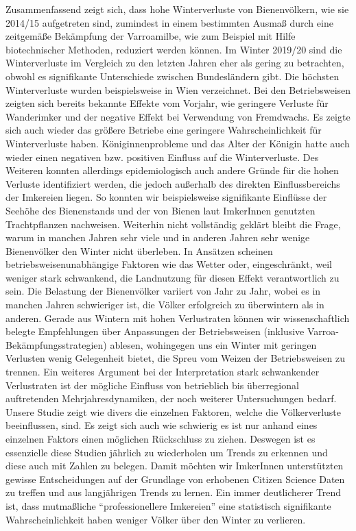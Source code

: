 Zusammenfassend zeigt sich, dass hohe Winterverluste von Bienenvölkern, wie sie 2014/15 aufgetreten sind, zumindest in einem bestimmten Ausmaß durch eine zeitgemäße Bekämpfung der Varroamilbe, wie zum Beispiel mit Hilfe biotechnischer Methoden, reduziert werden können.
\newline
Im Winter 2019/20 sind die Winterverluste im Vergleich zu den letzten Jahren eher als gering zu betrachten, obwohl es signifikante Unterschiede zwischen Bundesländern gibt. Die höchsten Winterverluste wurden beispielsweise in Wien verzeichnet. Bei den Betriebsweisen zeigten sich bereits bekannte Effekte vom Vorjahr, wie geringere Verluste für Wanderimker und der negative Effekt bei Verwendung von Fremdwachs. Es zeigte sich auch wieder das größere Betriebe eine geringere Wahrscheinlichkeit für Winterverluste haben.
\newline
Königinnenprobleme und das Alter der Königin hatte auch wieder einen negativen bzw. positiven Einfluss auf die Winterverluste. Des Weiteren konnten allerdings epidemiologisch auch andere Gründe für die hohen Verluste identifiziert werden, die jedoch außerhalb des direkten Einflussbereichs der Imkereien liegen. So konnten wir beispielsweise signifikante Einflüsse der Seehöhe des Bienenstands und der von Bienen laut ImkerInnen genutzten Trachtpflanzen nachweisen.
\newline
Weiterhin nicht vollständig geklärt bleibt die Frage, warum in manchen Jahren sehr viele und in anderen Jahren sehr wenige Bienenvölker den Winter nicht überleben. In Ansätzen scheinen betriebsweisenunabhängige Faktoren wie das Wetter \citep{switanek2017} oder, eingeschränkt, weil weniger stark schwankend, die Landnutzung \citep{kuchling2018} für diesen Effekt verantwortlich zu sein.
\newline
Die Belastung der Bienenvölker variiert von Jahr zu Jahr, wobei es in manchen Jahren schwieriger ist, die Völker erfolgreich zu überwintern als in anderen. Gerade aus Wintern mit hohen Verlustraten können wir wissenschaftlich belegte Empfehlungen über Anpassungen der Betriebsweisen (inklusive Varroa-Bekämpfungsstrategien) ablesen, wohingegen uns ein Winter mit geringen Verlusten wenig Gelegenheit bietet, die Spreu vom Weizen der Betriebsweisen zu trennen. Ein weiteres Argument bei der Interpretation stark schwankender Verlustraten ist der mögliche Einfluss von betrieblich bis überregional auftretenden Mehrjahresdynamiken, der noch weiterer Untersuchungen bedarf.
\newline
Unsere Studie zeigt wie divers die einzelnen Faktoren, welche die Völkerverluste beeinflussen, sind. Es zeigt sich auch wie schwierig es ist nur anhand eines einzelnen Faktors einen möglichen Rückschluss zu ziehen. Deswegen ist es essenzielle diese Studien jährlich zu wiederholen um Trends zu erkennen und diese auch mit Zahlen zu belegen. Damit möchten wir ImkerInnen unterstützten gewisse Entscheidungen auf der Grundlage von erhobenen Citizen Science Daten zu treffen und aus langjährigen Trends zu lernen. Ein immer deutlicherer Trend ist, dass mutmaßliche \enquote{professionellere Imkereien} eine statistisch signifikante Wahrscheinlichkeit haben weniger Völker über den Winter zu verlieren.